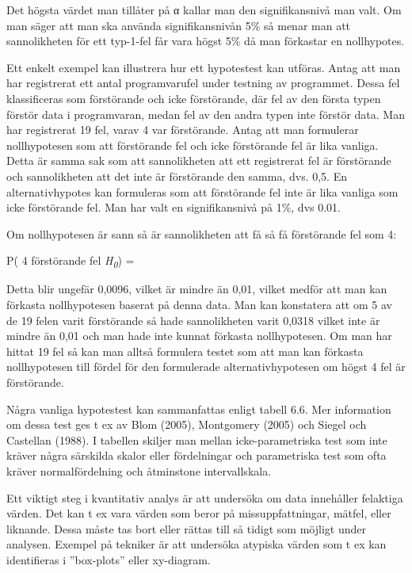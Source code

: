 Det högsta värdet man tillåter på α kallar man den signifikansnivå man
valt. Om man säger att man ska använda signifikansnivån 5\% så menar man
att sannolikheten för ett typ-1-fel får vara högst 5\% då man förkastar
en nollhypotes.

Ett enkelt exempel kan illustrera hur ett hypotestest kan utföras. Antag
att man har registrerat ett antal programvarufel under testning av
programmet. Dessa fel klassificeras som förstörande och icke
förstörande, där fel av den första typen förstör data i programvaran,
medan fel av den andra typen inte förstör data. Man har registrerat 19
fel, varav 4 var förstörande. Antag att man formulerar nollhypotesen som
att förstörande fel och icke förstörande fel är lika vanliga. Detta är
samma sak som att sannolikheten att ett registrerat fel är förstörande
och sannolikheten att det inte är förstörande den samma, dvs. 0,5. En
alternativhypotes kan formuleras som att förstörande fel inte är lika
vanliga som icke förstörande fel. Man har valt en signifikansnivå på
1\%, dvs 0.01.

Om nollhypotesen är sann så är sannolikheten att få så få förstörande
fel som 4:

P( 4 förstörande fel \textbar{} \emph{H\textsubscript{0}}) =

Detta blir ungefär 0,0096, vilket är mindre än 0,01, vilket medför att
man kan förkasta nollhypotesen baserat på denna data. Man kan konstatera
att om 5 av de 19 felen varit förstörande så hade sannolikheten varit
0,0318 vilket inte är mindre än 0,01 och man hade inte kunnat förkasta
nollhypotesen. Om man har hittat 19 fel så kan man alltså formulera
testet som att man kan förkasta nollhypotesen till fördel för den
formulerade alternativhypotesen om högst 4 fel är förstörande.

Några vanliga hypotestest kan sammanfattas enligt tabell 6.6. Mer
information om dessa test ges t ex av Blom (2005), Montgomery (2005) och
Siegel och Castellan (1988). I tabellen skiljer man mellan
icke-parametriska test som inte kräver några särskilda skalor eller
fördelningar och parametriska test som ofta kräver normalfördelning och
åtminstone intervallskala.

Ett viktigt steg i kvantitativ analys är att undersöka om data
innehåller felaktiga värden. Det kan t ex vara värden som beror på
missuppfattningar, mätfel, eller liknande. Dessa måste tas bort eller
rättas till så tidigt som möjligt under analysen. Exempel på tekniker är
att undersöka atypiska värden som t ex kan identifieras i ''box-plots''
eller xy-diagram.

